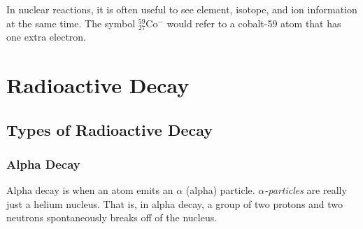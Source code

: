 In nuclear reactions, it is often useful to see element, isotope, and ion information at the same time.  The symbol $^{59}_{27}$Co$^{-}$ would refer to a cobalt-59 atom that has one extra electron.  









\section{Radioactive Decay}

\subsection{Types of Radioactive Decay}
\subsubsection{Alpha Decay}
Alpha decay is when an atom emits an $\alpha$ (alpha) particle.  \textit{$\alpha$-particles} are really just a helium nucleus.  That is, in alpha decay, a group of two protons and two neutrons spontaneously breaks off of the nucleus.  

